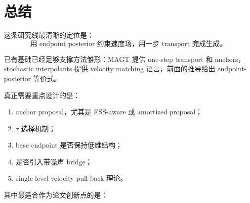 \documentclass[UTF8,11pt]{ctexart}
\begin{document}
\section{总结}

这条研究线最清晰的定位是：
\[
\boxed{
\text{用 endpoint posterior 约束速度场，用一步 transport 完成生成。}
}
\]

已有基础已经足够支撑方法雏形：MAGT 提供 one-step transport 和 anchors，stochastic interpolants 提供 velocity matching 语言，前面的推导给出 endpoint-posterior 等价式。

真正需要重点设计的是：
\begin{enumerate}
\item anchor proposal，尤其是 ESS-aware 或 amortized proposal；
\item \(\tau\) 选择机制；
\item base endpoint 是否保持低维结构；
\item 是否引入带噪声 bridge；
\item single-level velocity pull-back 理论。
\end{enumerate}

其中最适合作为论文创新点的是：
\begin{center}
\end{center}
\end{document}
